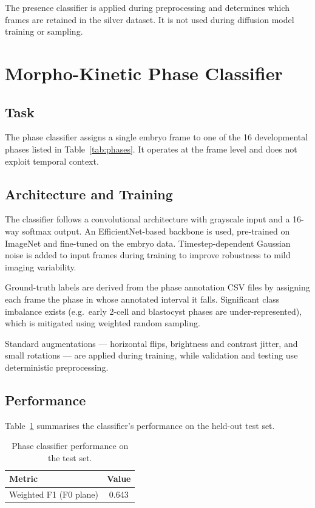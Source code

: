 \documentclass[12pt, a4paper, twoside]{report}
\begin{document}
The presence classifier is applied during preprocessing and determines which
frames are retained in the silver dataset.
It is not used during diffusion model training or sampling.

\section{Morpho-Kinetic Phase Classifier}
\label{sec:phase_classifier}

\subsection{Task}
\label{ssec:phase_task}

The phase classifier assigns a single embryo frame to one of the 16
developmental phases listed in Table~\ref{tab:phases}.
It operates at the frame level and does not exploit temporal context.

\subsection{Architecture and Training}
\label{ssec:phase_arch}

The classifier follows a convolutional architecture with grayscale input and
a 16-way softmax output.
An EfficientNet-based backbone is used, pre-trained on ImageNet and
fine-tuned on the embryo data.
Timestep-dependent Gaussian noise is added to input frames during training to
improve robustness to mild imaging variability.

Ground-truth labels are derived from the phase annotation CSV files by
assigning each frame the phase in whose annotated interval it falls.
Significant class imbalance exists (e.g.\ early 2-cell and blastocyst phases
are under-represented), which is mitigated using weighted random sampling.

Standard augmentations — horizontal flips, brightness and contrast jitter,
and small rotations — are applied during training, while validation and
testing use deterministic preprocessing.

\subsection{Performance}
\label{ssec:phase_results}

Table~\ref{tab:phase_results} summarises the classifier's performance on the
held-out test set.

\begin{table}[H]
\centering
\caption{Phase classifier performance on the test set.}
\label{tab:phase_results}
\begin{tabular}{lc}
\toprule
\textbf{Metric} & \textbf{Value} \\
\midrule
Weighted F1 (F0 plane) & 0.643 \\
\bottomrule
\end{tabular}
\end{table}
\end{document}

